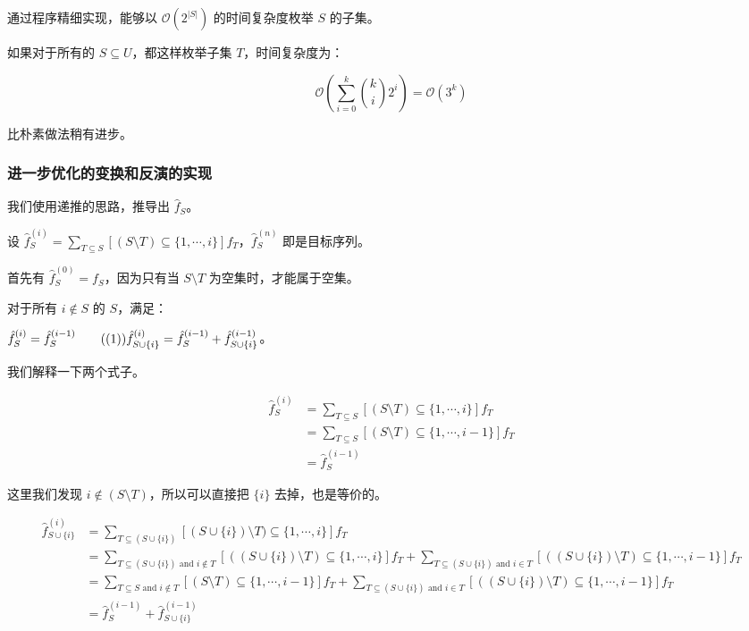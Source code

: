\documentclass{article}
\begin{document}
通过程序精细实现，能够以 $\mathcal O(2^{|S|})$ 的时间复杂度枚举 $S$ 的子集。

如果对于所有的 $S \subseteq U$，都这样枚举子集 $T$，时间复杂度为：

$$\mathcal O\left(\sum_{i=0}^k \binom{k}{i}2^i\right)= \mathcal O(3^k)$$

比朴素做法稍有进步。

\subsubsection*{进一步优化的变换和反演的实现}

我们使用递推的思路，推导出 $\hat f_S$。

设 $\hat f_S^{(i)}=\sum_{T\subseteq S}[(S\setminus T)\subseteq\{1,\cdots,i\}]f_T$，$\hat f_S^{(n)}$ 即是目标序列。

首先有 $\hat f_S^{(0)}=f_S$，因为只有当 $S \setminus T$ 为空集时，才能属于空集。

对于所有 $i\notin S$ 的 $S$，满足：

$\hat f_S^{(i)}=\hat f_S^{(i-1)} \tag{(1)}\\ \hat f_{S\cup\{i\}}^{(i)}=\hat f_S^{(i-1)}+\hat f_{S\cup\{i\}}^{(i-1)}$。

我们解释一下两个式子。

$$\begin{aligned}
\hat f_S^{(i)} &= \sum_{T \subseteq S}[(S \setminus T)\subseteq\{1,\cdots,i\}]f_T\\
               &= \sum_{T \subseteq S}[(S \setminus T)\subseteq\{1,\cdots,i-1\}]f_T\\
               &= \hat f_S^{(i-1)}
\end{aligned}$$

这里我们发现 $i \notin (S \setminus T)$，所以可以直接把 $\{i\}$ 去掉，也是等价的。

$$
\begin{aligned}
\hat f_{S\cup\{i\}}^{(i)} &= \sum_{T \subseteq (S\cup\{i\})}[(S\cup\{i\}) \setminus T)\subseteq\{1,\cdots,i\}]f_T\\
               &= \sum_{T \subseteq (S\cup\{i\}) \text{ and } i \notin T}[((S\cup\{i\}) \setminus T)\subseteq\{1,\cdots,i\}]f_T+\sum_{T \subseteq (S\cup\{i\}) \text{ and } i \in T}[((S\cup\{i\}) \setminus T)\subseteq\{1,\cdots,i-1\}]f_T\\
               &= \sum_{T \subseteq S \text{ and } i \notin T}[(S \setminus T)\subseteq\{1,\cdots,i-1\}]f_T+\sum_{T \subseteq (S\cup\{i\}) \text{ and } i \in T}[((S\cup\{i\}) \setminus T)\subseteq\{1,\cdots,i-1\}]f_T\\
               &= \hat f_S^{(i-1)}+\hat f_{S \cup \{i\}}^{(i-1)}
\end{aligned}
$$
\end{document}
